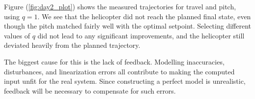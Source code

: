Figure (\ref{fig:day2_plot}) shows the measured trajectories for travel and pitch, using $q = 1$. We see that the helicopter did not reach the planned final state, even though the pitch matched fairly well with the optimal setpoint. Selecting different values of $q$ did not lead to any significant improvements, and the helicopter still deviated heavily from the planned trajectory.

The biggest cause for this is the lack of feedback. Modelling inaccuracies, disturbances, and linearization errors all contribute to making the computed input unfit for the real system. Since constructing a perfect model is unrealistic, feedback will be necessary to compensate for such errors.
